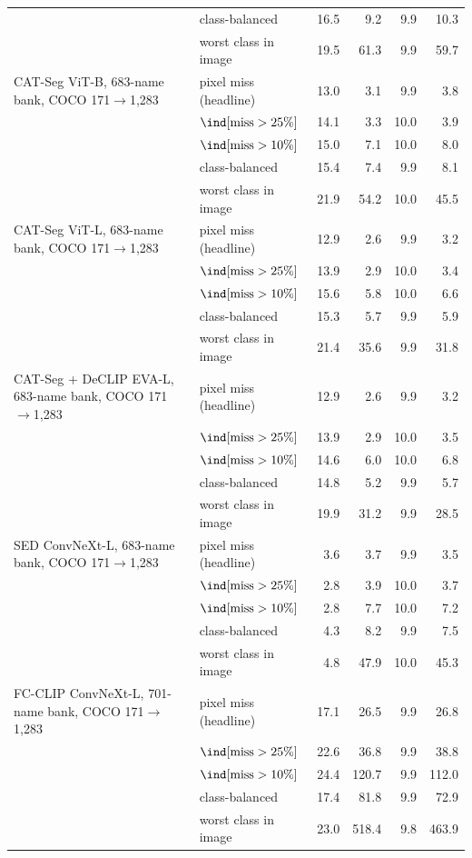 \begin{tabular}{@{}llrrrr@{}}
 & class-balanced & 16.5 & 9.2 & 9.9 & 10.3 \\
 & worst class in image & 19.5 & 61.3 & 9.9 & 59.7 \\
\midrule
CAT-Seg ViT-B, 683-name bank, COCO 171$\to$1,283 & pixel miss (headline) & 13.0 & 3.1 & 9.9 & 3.8 \\
 & $\ind[\text{miss} > 25\%]$ & 14.1 & 3.3 & 10.0 & 3.9 \\
 & $\ind[\text{miss} > 10\%]$ & 15.0 & 7.1 & 10.0 & 8.0 \\
 & class-balanced & 15.4 & 7.4 & 9.9 & 8.1 \\
 & worst class in image & 21.9 & 54.2 & 10.0 & 45.5 \\
\midrule
CAT-Seg ViT-L, 683-name bank, COCO 171$\to$1,283 & pixel miss (headline) & 12.9 & 2.6 & 9.9 & 3.2 \\
 & $\ind[\text{miss} > 25\%]$ & 13.9 & 2.9 & 10.0 & 3.4 \\
 & $\ind[\text{miss} > 10\%]$ & 15.6 & 5.8 & 10.0 & 6.6 \\
 & class-balanced & 15.3 & 5.7 & 9.9 & 5.9 \\
 & worst class in image & 21.4 & 35.6 & 9.9 & 31.8 \\
\midrule
CAT-Seg + DeCLIP EVA-L, 683-name bank, COCO 171$\to$1,283 & pixel miss (headline) & 12.9 & 2.6 & 9.9 & 3.2 \\
 & $\ind[\text{miss} > 25\%]$ & 13.9 & 2.9 & 10.0 & 3.5 \\
 & $\ind[\text{miss} > 10\%]$ & 14.6 & 6.0 & 10.0 & 6.8 \\
 & class-balanced & 14.8 & 5.2 & 9.9 & 5.7 \\
 & worst class in image & 19.9 & 31.2 & 9.9 & 28.5 \\
\midrule
SED ConvNeXt-L, 683-name bank, COCO 171$\to$1,283 & pixel miss (headline) & 3.6 & 3.7 & 9.9 & 3.5 \\
 & $\ind[\text{miss} > 25\%]$ & 2.8 & 3.9 & 10.0 & 3.7 \\
 & $\ind[\text{miss} > 10\%]$ & 2.8 & 7.7 & 10.0 & 7.2 \\
 & class-balanced & 4.3 & 8.2 & 9.9 & 7.5 \\
 & worst class in image & 4.8 & 47.9 & 10.0 & 45.3 \\
\midrule
FC-CLIP ConvNeXt-L, 701-name bank, COCO 171$\to$1,283 & pixel miss (headline) & 17.1 & 26.5 & 9.9 & 26.8 \\
 & $\ind[\text{miss} > 25\%]$ & 22.6 & 36.8 & 9.9 & 38.8 \\
 & $\ind[\text{miss} > 10\%]$ & 24.4 & 120.7 & 9.9 & 112.0 \\
 & class-balanced & 17.4 & 81.8 & 9.9 & 72.9 \\
 & worst class in image & 23.0 & 518.4 & 9.8 & 463.9 \\
\bottomrule
\end{tabular}
